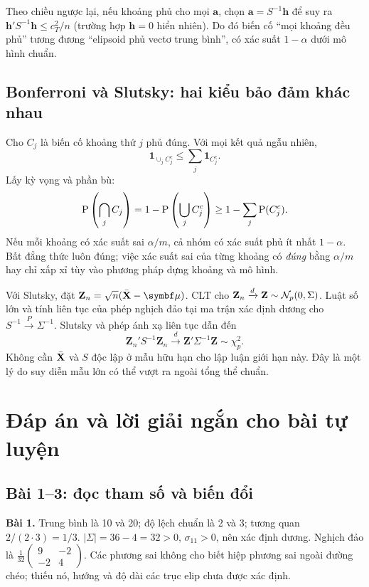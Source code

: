 Theo chiều ngược lại, nếu khoảng phủ cho mọi $\mathbf a$, chọn
$\mathbf a=S^{-1}\mathbf h$ để suy ra
$\mathbf h'S^{-1}\mathbf h\le c_T^2/n$ (trường hợp $\mathbf h=0$ hiển nhiên).
Do đó biến cố ``mọi khoảng đều phủ'' tương đương ``elipsoid phủ vectơ
trung bình'', có xác suất $1-\alpha$ dưới mô hình chuẩn.

\subsection{Bonferroni và Slutsky: hai kiểu bảo đảm khác nhau}
Cho $C_j$ là biến cố khoảng thứ $j$ phủ đúng. Với mọi kết quả ngẫu nhiên,
\[
 \mathbf1_{\cup_j C_j^c}\le\sum_j\mathbf1_{C_j^c}.
\]
Lấy kỳ vọng và phần bù:
\[
 \operatorname{P}\left(\bigcap_j C_j\right)
 =1-\operatorname{P}\left(\bigcup_j C_j^c\right)
 \ge1-\sum_j\operatorname{P}(C_j^c).
\]
Nếu mỗi khoảng có xác suất sai $\alpha/m$, cả nhóm có xác suất phủ
ít nhất $1-\alpha$. Bất đẳng thức luôn đúng; việc xác suất sai của từng
khoảng có \emph{đúng} bằng $\alpha/m$ hay chỉ xấp xỉ tùy vào phương pháp
dựng khoảng và mô hình.

Với Slutsky, đặt $\mathbf Z_n=\sqrt n(\Xbar-\vmu)$.
CLT cho $\mathbf Z_n\xrightarrow{d}\mathbf Z\sim\mathcal N_p(0,\Sigma)$.
Luật số lớn và tính liên tục của phép nghịch đảo tại ma trận xác định
dương cho $S^{-1}\xrightarrow{P}\Sigma^{-1}$.
Slutsky và phép ánh xạ liên tục dẫn đến
\[
 \mathbf Z_n'S^{-1}\mathbf Z_n\xrightarrow{d}
 \mathbf Z'\Sigma^{-1}\mathbf Z\sim\chi^2_p.
\]
Không cần $\bar{\mathbf X}$ và $S$ độc lập ở mẫu hữu hạn cho lập luận giới hạn này.
Đây là một lý do suy diễn mẫu lớn có thể vượt ra ngoài tổng thể chuẩn.

\clearpage
\section{Đáp án và lời giải ngắn cho bài tự luyện}
\label{app:answers}
\subsection*{Bài 1--3: đọc tham số và biến đổi}
\noindent\textbf{Bài 1.}
Trung bình là 10 và 20; độ lệch chuẩn là 2 và 3; tương quan
$2/(2\cdot3)=1/3$. $|\Sigma|=36-4=32>0$, $\sigma_{11}>0$, nên
xác định dương. Nghịch đảo là
$\frac1{32}\begin{pmatrix}9&-2\\-2&4\end{pmatrix}$.
Các phương sai không cho biết hiệp phương sai ngoài đường chéo; thiếu
nó, hướng và độ dài các trục elip chưa được xác định.

